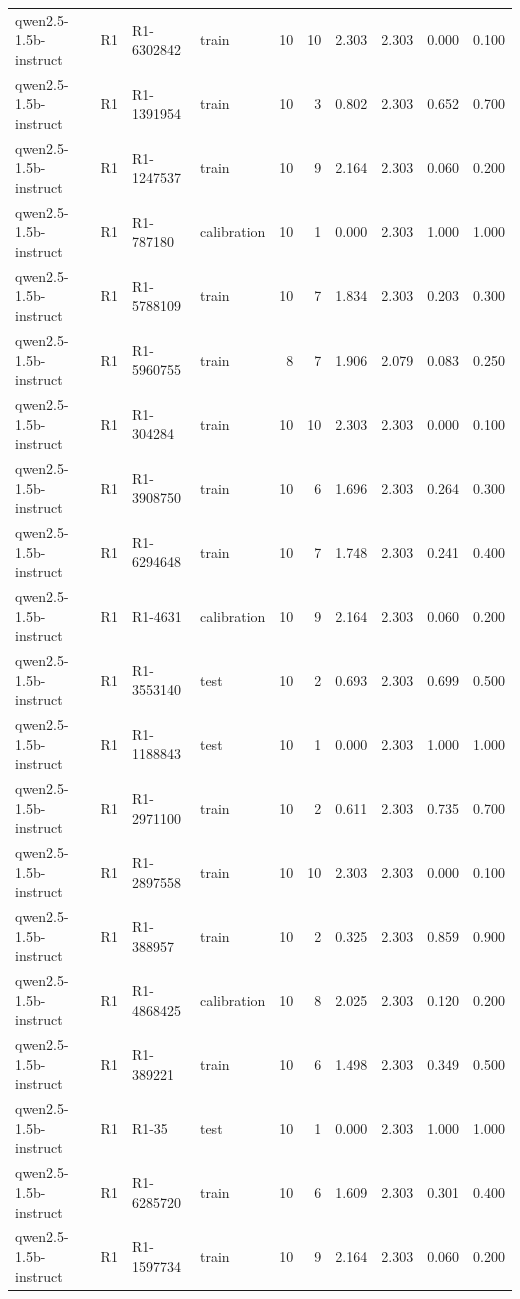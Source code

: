 \begin{table}
\begin{tabular}{llllrrrrrr}
qwen2.5-1.5b-instruct & R1 & R1-6302842 & train & 10 & 10 & 2.303 & 2.303 & 0.000 & 0.100 \\
qwen2.5-1.5b-instruct & R1 & R1-1391954 & train & 10 & 3 & 0.802 & 2.303 & 0.652 & 0.700 \\
qwen2.5-1.5b-instruct & R1 & R1-1247537 & train & 10 & 9 & 2.164 & 2.303 & 0.060 & 0.200 \\
qwen2.5-1.5b-instruct & R1 & R1-787180 & calibration & 10 & 1 & 0.000 & 2.303 & 1.000 & 1.000 \\
qwen2.5-1.5b-instruct & R1 & R1-5788109 & train & 10 & 7 & 1.834 & 2.303 & 0.203 & 0.300 \\
qwen2.5-1.5b-instruct & R1 & R1-5960755 & train & 8 & 7 & 1.906 & 2.079 & 0.083 & 0.250 \\
qwen2.5-1.5b-instruct & R1 & R1-304284 & train & 10 & 10 & 2.303 & 2.303 & 0.000 & 0.100 \\
qwen2.5-1.5b-instruct & R1 & R1-3908750 & train & 10 & 6 & 1.696 & 2.303 & 0.264 & 0.300 \\
qwen2.5-1.5b-instruct & R1 & R1-6294648 & train & 10 & 7 & 1.748 & 2.303 & 0.241 & 0.400 \\
qwen2.5-1.5b-instruct & R1 & R1-4631 & calibration & 10 & 9 & 2.164 & 2.303 & 0.060 & 0.200 \\
qwen2.5-1.5b-instruct & R1 & R1-3553140 & test & 10 & 2 & 0.693 & 2.303 & 0.699 & 0.500 \\
qwen2.5-1.5b-instruct & R1 & R1-1188843 & test & 10 & 1 & 0.000 & 2.303 & 1.000 & 1.000 \\
qwen2.5-1.5b-instruct & R1 & R1-2971100 & train & 10 & 2 & 0.611 & 2.303 & 0.735 & 0.700 \\
qwen2.5-1.5b-instruct & R1 & R1-2897558 & train & 10 & 10 & 2.303 & 2.303 & 0.000 & 0.100 \\
qwen2.5-1.5b-instruct & R1 & R1-388957 & train & 10 & 2 & 0.325 & 2.303 & 0.859 & 0.900 \\
qwen2.5-1.5b-instruct & R1 & R1-4868425 & calibration & 10 & 8 & 2.025 & 2.303 & 0.120 & 0.200 \\
qwen2.5-1.5b-instruct & R1 & R1-389221 & train & 10 & 6 & 1.498 & 2.303 & 0.349 & 0.500 \\
qwen2.5-1.5b-instruct & R1 & R1-35 & test & 10 & 1 & 0.000 & 2.303 & 1.000 & 1.000 \\
qwen2.5-1.5b-instruct & R1 & R1-6285720 & train & 10 & 6 & 1.609 & 2.303 & 0.301 & 0.400 \\
qwen2.5-1.5b-instruct & R1 & R1-1597734 & train & 10 & 9 & 2.164 & 2.303 & 0.060 & 0.200 \\

\end{tabular}
\end{table}

